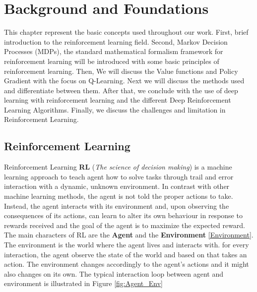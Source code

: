 
\chapter{Background and Foundations}\label{chapter:Background and Foundations}

This chapter represent the basic concepts used throughout our work. First, brief introduction to the reinforcement learning field. Second, Markov Decision Processes (MDPs), the standard mathematical formalism framework for reinforcement learning will be introduced with some basic principles of reinforcement learning. Then, We will discuss the Value functions and Policy Gradient with the focus on Q-Learning. Next we will discuss the methods used and differentiate between them. After that, we conclude with the use of deep learning with reinforcement learning and the different Deep Reinforcement Learning Algorithms. Finally, we discuss the challenges and limitation in Reinforcement Learning.

\section{Reinforcement Learning}
Reinforcement Learning \textbf{RL} (\textit{The science of decision making}) is a machine learning approach to teach agent how to solve tasks through trail and error interaction with a dynamic, unknown environment. In contrast with other machine learning methods, the agent is not told the proper actions to take. Instead, the agent interacts with its environment and, upon observing the consequences of its actions, can learn to alter its own behaviour in response to rewards received and the goal of the agent is to maximize the expected reward. The main characters of RL are the \textbf{Agent} and the \textbf{Environment} \ref{Environment}. The environment is the world where the agent lives and interacts with. for every interaction, the agent observe the state of the world and based on that takes an action. The environment changes accordingly to the agent's actions and it might also changes on its own. The typical interaction loop between agent and environment is illustrated in Figure \ref{fig:Agent_Env}

